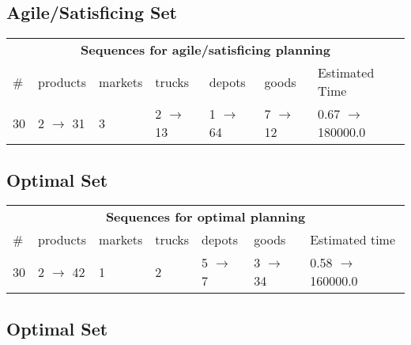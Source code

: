 \documentclass{article}
\begin{document}
                         \subsection*{Agile/Satisficing Set}

                        \begin{center}
                        \begin{tabular}{@{}l|l|l|l|l|l|l@{}}
                        \multicolumn{7}{c}{\bf \large Sequences for agile/satisficing planning}\\
                        \# & products & markets & trucks & depots & goods & Estimated Time\\\midrule
                        30&2 $\rightarrow$ 31&3&2 $\rightarrow$ 13&1 $\rightarrow$ 64&7 $\rightarrow$ 12&0.67 $\rightarrow$ 180000.0
                        \end{tabular}
                        \end{center}
                    
                            \subsection*{Optimal Set}

                            \begin{center}
                            \begin{tabular}{@{}l|l|l|l|l|l|l@{}}
                            \multicolumn{7}{c}{\bf \large Sequences for optimal planning}\\
                            \# & products & markets & trucks & depots & goods & Estimated time\\\midrule
                            30&2 $\rightarrow$ 42&1&2&5 $\rightarrow$ 7&3 $\rightarrow$ 34&0.58 $\rightarrow$ 160000.0
                            \end{tabular}
                            \end{center}
                    
                                \subsection*{Optimal Set}
                                
\end{document}
